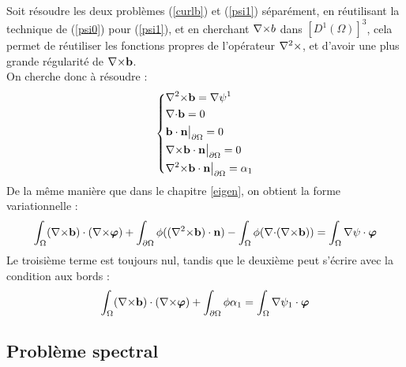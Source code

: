 Soit résoudre les deux problèmes (\ref{curlb}) et (\ref{psi1}) séparément, en réutilisant la technique de (\ref{psi0}) pour (\ref{psi1}), et en cherchant ${\nabla\times} b$ dans $[D^1(\Omega)]^3$, cela permet de réutiliser les fonctions propres de l'opérateur ${\nabla^2\times}$, et d'avoir une plus grande régularité de ${\nabla\times} \mathbf{b}$.\\
On cherche donc à résoudre :
\[
\left\{
\begin{aligned}
&{\nabla^2\times} \mathbf{b} = {\nabla}\psi^1\\
&{\nabla\cdot} \mathbf{b} = 0\\
&\mathbf{b}\cdot \mathbf{n}{\big\rvert_{\partial\Omega}} = 0\\
&{\nabla\times} \mathbf{b}\cdot \mathbf{n}{\big\rvert_{\partial\Omega}} = 0\\
&{\nabla^2\times} \mathbf{b}\cdot \mathbf{n}{\big\rvert_{\partial\Omega}} = \alpha_1
\end{aligned}
\right.
\]
De la même manière que dans le chapitre \ref{eigen}, on obtient la forme variationnelle :
\[
\int_\Omega ({\nabla\times}\mathbf{b})\cdot({\nabla\times}\bm{\varphi}) + \int_{\partial\Omega} \phi(({\nabla^2\times}\mathbf{b})\cdot \mathbf{n}) - \int_\Omega \phi({\nabla\cdot}({\nabla\times} \mathbf{b}))  = \int_\Omega {\nabla}\psi\cdot\bm{\varphi}
\]
Le troisième terme est toujours nul, tandis que le deuxième peut s'écrire avec la condition aux bords :
\begin{equation}
\label{bd1}
\int_\Omega ({\nabla\times}\mathbf{b})\cdot({\nabla\times}\bm{\varphi}) + \int_{\partial\Omega} \phi\alpha_1 = \int_\Omega {\nabla}\psi_1\cdot\bm{\varphi}
\end{equation}

\subsection{Problème spectral}
\label{spectre}

